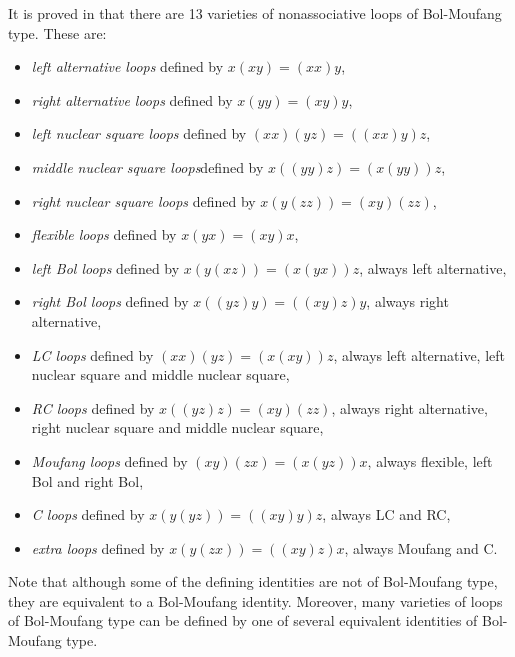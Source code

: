 \documentclass[a4paper,11pt]{report}
\begin{document}
{{It is proved in \cite{PhiVoj} that there are 13 varieties of nonassociative loops of Bol-Moufang type. These
are: 
\begin{itemize}
\item \emph{left alternative loops} defined by $x(xy) = (xx)y$,
\item \emph{right alternative loops} defined by $x(yy) = (xy)y$,
\item \emph{left nuclear square loops} defined by $(xx)(yz) = ((xx)y)z$,
\item \emph{middle nuclear square loops}defined by $x((yy)z) = (x(yy))z$,
\item \emph{right nuclear square loops} defined by $x(y(zz)) = (xy)(zz)$,
\item \emph{flexible loops} defined by $x(yx) = (xy)x$,
\item \emph{left Bol loops} defined by $x(y(xz)) = (x(yx))z$, always left alternative,
\item \emph{right Bol loops} defined by $x((yz)y) = ((xy)z)y$, always right alternative,
\item \emph{LC loops} defined by $(xx)(yz) = (x(xy))z$, always left alternative, left nuclear square and middle nuclear square,
\item \emph{RC loops} defined by $x((yz)z) = (xy)(zz)$, always right alternative, right nuclear square and middle nuclear square,
\item \emph{Moufang loops} defined by $(xy)(zx) = (x(yz))x$, always flexible, left Bol and right Bol,
\item \emph{C loops} defined by $x(y(yz)) = ((xy)y)z$, always LC and RC,
\item \emph{extra loops} defined by $x(y(zx)) = ((xy)z)x$, always Moufang and C.
\end{itemize}
 

Note that although some of the defining identities are not of Bol-Moufang
type, they are equivalent to a Bol-Moufang identity. Moreover, many varieties
of loops of Bol-Moufang type can be defined by one of several equivalent
identities of Bol-Moufang type. 

}}
\end{document}
